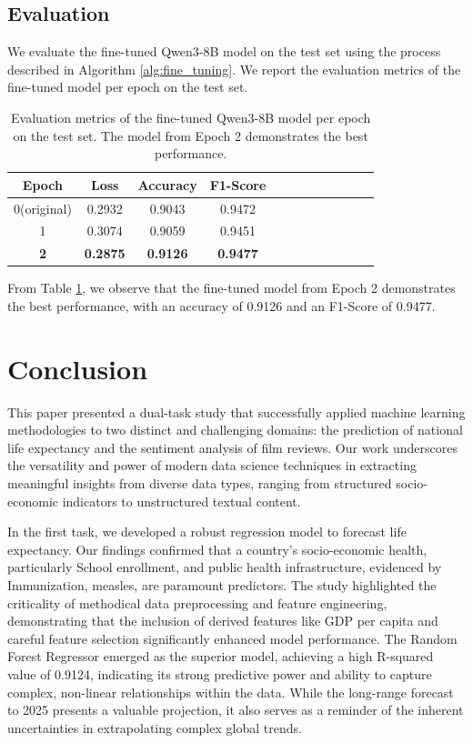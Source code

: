 \documentclass{article}
\begin{document}
\subsection{Evaluation}
\label{ssec:evaluation}

We evaluate the fine-tuned Qwen3-8B model on the test set using the process described in 
Algorithm \ref{alg:fine_tuning}.
We report the evaluation metrics of the fine-tuned model per epoch on the test set.

\begin{table}[H]
\centering
\caption{Evaluation metrics of the fine-tuned Qwen3-8B model per epoch on the test set. The model from Epoch 2 demonstrates the best performance.}
\label{tbl:eval_results}
\begin{tabular}{@{}cccc@{}cccc@{}cccc@{}}
\toprule
\textbf{Epoch} & \textbf{Loss} & \textbf{Accuracy} & \textbf{F1-Score} \\ \midrule
0(original) & 0.2932 & 0.9043 & 0.9472 \\
1 & 0.3074& 0.9059 & 0.9451 \\
\textbf{2} & \textbf{0.2875} & \textbf{0.9126} & \textbf{0.9477} \\
\end{tabular}
\end{table}

From Table \ref{tbl:eval_results}, we observe that the fine-tuned model from Epoch 2 demonstrates the best 
performance, with an accuracy of 0.9126 and an F1-Score of 0.9477.


\section{Conclusion}
\label{sec:conclusion}

This paper presented a dual-task study that successfully applied machine learning methodologies to two 
distinct and challenging domains: the prediction of national life expectancy and the sentiment analysis 
of film reviews. Our work underscores the versatility and power of modern data science techniques in 
extracting meaningful insights from diverse data types, ranging from structured socio-economic indicators 
to unstructured textual content.

In the first task, we developed a robust regression model to forecast life expectancy. Our findings 
confirmed that a country's socio-economic health, particularly School enrollment, and public health 
infrastructure, evidenced by Immunization, measles, are paramount predictors. The study highlighted the
 criticality of methodical data preprocessing and feature engineering, demonstrating that the inclusion 
 of derived features like GDP per capita and careful feature selection significantly enhanced model performance. 
 The Random Forest Regressor emerged as the superior model, achieving a high R-squared value of 0.9124, 
 indicating its strong predictive power and ability to capture complex, non-linear relationships within 
 the data. While the long-range forecast to 2025 presents a valuable projection, it also serves as a 
 reminder of the inherent uncertainties in extrapolating complex global trends.
\end{document}
